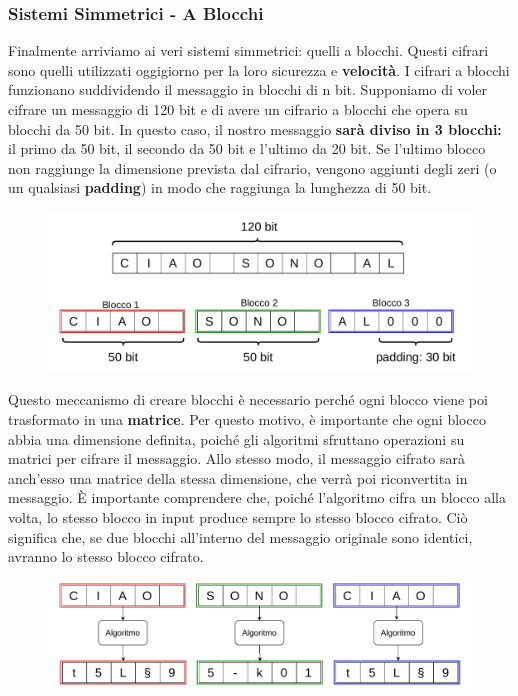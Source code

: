 \documentclass{report}
\begin{document}
\newpage
\subsubsection{Sistemi Simmetrici - A Blocchi}

Finalmente arriviamo ai veri sistemi simmetrici: quelli a blocchi. Questi cifrari sono quelli utilizzati oggigiorno per la loro sicurezza e \textbf{velocità}. I cifrari a blocchi funzionano suddividendo il messaggio in blocchi di n bit. Supponiamo di voler cifrare un messaggio di 120 bit e di avere un cifrario a blocchi che opera su blocchi da 50 bit. In questo caso, il nostro messaggio \textbf{sarà diviso in 3 blocchi:} il primo da 50 bit, il secondo da 50 bit e l’ultimo da 20 bit. Se l’ultimo blocco non raggiunge la dimensione prevista dal cifrario, vengono aggiunti degli zeri (o un qualsiasi \textbf{padding}) in modo che raggiunga la lunghezza di 50 bit.


\begin{figure}[h]
    \centering
    \includegraphics[width=\linewidth]{logos/cripto6.pdf}
\end{figure}



Questo meccanismo di creare blocchi è necessario perché ogni blocco viene poi trasformato in una \textbf{matrice}. Per questo motivo, è importante che ogni blocco abbia una dimensione definita, poiché gli algoritmi sfruttano operazioni su matrici per cifrare il messaggio. Allo stesso modo, il messaggio cifrato sarà anch’esso una matrice della stessa dimensione, che verrà poi riconvertita in messaggio. È importante comprendere che, poiché l’algoritmo cifra un blocco alla volta, lo stesso blocco in input produce sempre lo stesso blocco cifrato. Ciò significa che, se due blocchi all’interno del messaggio originale sono identici, avranno lo stesso blocco cifrato.


\begin{figure}[h]
    \centering
    \includegraphics[width=\linewidth]{logos/cripto7.pdf}
\end{figure}
\end{document}
